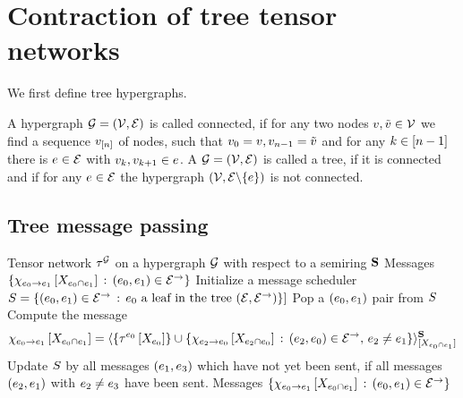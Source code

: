 \section{Contraction of tree tensor networks}

We first define tree hypergraphs.

\begin{definition}
    A hypergraph $\mathcal{G}=(\mathcal{V},\mathcal{E})$ is called connected, if for any two nodes $v,\tilde{v}\in\mathcal{V}$ we find a sequence $v_{[n]}$ of nodes, such that $v_{0}=v,v_{n-1}=\tilde{v}$ and for any $k\in[n-1]$ there is $e\in\mathcal{E}$ with $v_{k},v_{k+1}\in e$.
    A $\mathcal{G}=(\mathcal{V},\mathcal{E})$ is called a tree, if it is connected and if for any $e\in\mathcal{E}$ the hypergraph $(\mathcal{V},\mathcal{E}\backslash\{e\})$ is not connected.
\end{definition}

\subsection{Tree message passing}

\begin{algorithm}[hbt!]
    \caption{Tree Belief Propagation}\label{alg:treeBeliefPropagation}
    \begin{algorithmic}
        \Require Tensor network $\tau^{\mathcal{G}}$ on a hypergraph $\mathcal{G}$ with respect to a semiring $\mathbf{S}$
        \Ensure Messages $\{\chi_{e_{0} \rightarrow e_{1}}\left[X_{e_{0} \cap e_{1}}\right]\,:\,(e_{0},e_{1})\in\mathcal{E}^{\rightarrow}\}$
        \iosepline
        \State Initialize a message scheduler $S=\{(e_{0},e_{1}) \in \mathcal{E}^{\rightarrow} \,:\, e_{0} \text{ a leaf in the tree } (\mathcal{E},\mathcal{E}^{\rightarrow})\}]$
            \State Pop a $(e_{0},e_{1})$ pair from $S$
            \State Compute the message
            \begin{align*}
                \chi_{e_{0} \rightarrow e_{1}}\left[X_{e_{0} \cap e_{1}}\right]
                = \langle\{\tau^{e_{0}}\left[X_{e_{0}}\right]\}
                    \cup \{\chi_{e_{2} \rightarrow e_{0}}\left[X_{e_{2}\cap e_{0}}\right] \,:\, (e_{2},e_{0})\in\mathcal{E}^{\rightarrow} ,\, e_{2}\neq e_{1}\}
                \rangle^{\mathbf{S}}_{[X_{e_{0}\cap e_{1}}]}
            \end{align*}
            \State Update $S$ by all messages $(e_{1},e_{3})$ which have not yet been sent, if all messages $(e_{2},e_{1})$ with $e_{2}\neq e_{3}$ have been sent.
        \EndWhile
        \State \Return Messages $\{\chi_{e_{0} \rightarrow e_{1}}\left[X_{e_{0} \cap e_{1}}\right]\,:\,(e_{0},e_{1})\in\mathcal{E}^{\rightarrow}\}$
    \end{algorithmic}
\end{algorithm}


